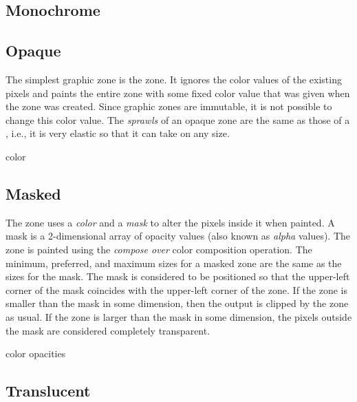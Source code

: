 \subsection{Monochrome}
\label{sec-zones-graphic-monocrome}


\subsection{Opaque}
\label{sec-zones-graphic-opaque}

The simplest graphic zone is the  zone.  It ignores the
color values of the existing pixels and paints the entire zone with
some fixed color value that was given when the zone was created.
Since graphic zones are immutable, it is not possible to change this
color value.  The \emph{sprawls} of an opaque zone are the same as
those of a  , i.e., it
is very elastic so that it can take on any size. 


 {color}

\subsection{Masked}
\label{sec-zones-graphic-masked}

The  zone uses a \emph{color} and a \emph{mask} to alter
the pixels inside it when painted.  A mask is a 2-dimensional array of
opacity values (also known as \emph{alpha} values).  The zone is
painted using the \emph{compose over} color composition operation.
The minimum, preferred, and maximum sizes for a masked zone are the
same as the sizes for the mask.  The mask is considered to be
positioned so that the upper-left corner of the mask coincides with
the upper-left corner of the zone.  If the zone is smaller than the
mask in some dimension, then the output is clipped by the zone as
usual.  If the zone is larger than the mask in some dimension, the
pixels outside the mask are considered completely transparent. 


 {color opacities}

\subsection{Translucent}
\label{sec-zones-graphic-translucent}

